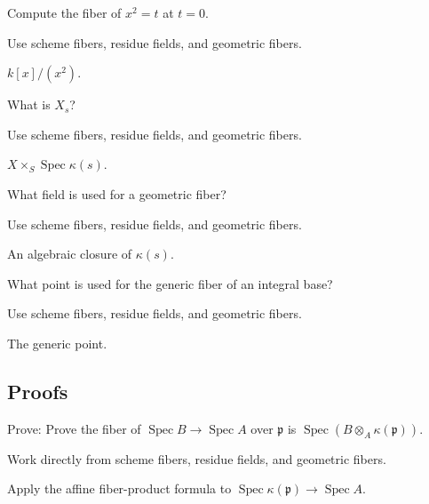\begin{exercise}\label{exr:vi25-expand-02}
Compute the fiber of $x^2=t$ at $t=0$.
\end{exercise}
\begin{hint}
Use scheme fibers, residue fields, and geometric fibers.
\end{hint}
\begin{solution}
$k[x]/(x^2)$.
\end{solution}

\begin{exercise}\label{exr:vi25-expand-03}
What is $X_s$?
\end{exercise}
\begin{hint}
Use scheme fibers, residue fields, and geometric fibers.
\end{hint}
\begin{solution}
$X\times_S\operatorname{Spec}\kappa(s)$.
\end{solution}

\begin{exercise}\label{exr:vi25-expand-04}
What field is used for a geometric fiber?
\end{exercise}
\begin{hint}
Use scheme fibers, residue fields, and geometric fibers.
\end{hint}
\begin{solution}
An algebraic closure of $\kappa(s)$.
\end{solution}

\begin{exercise}\label{exr:vi25-expand-05}
What point is used for the generic fiber of an integral base?
\end{exercise}
\begin{hint}
Use scheme fibers, residue fields, and geometric fibers.
\end{hint}
\begin{solution}
The generic point.
\end{solution}

\subsection*{Proofs}

\begin{exercise}\label{exr:vi25-expand-06}
Prove: Prove the fiber of $\operatorname{Spec}B\to\operatorname{Spec}A$ over $\mathfrak p$ is $\operatorname{Spec}(B\otimes_A\kappa(\mathfrak p))$.
\end{exercise}
\begin{hint}
Work directly from scheme fibers, residue fields, and geometric fibers.
\end{hint}
\begin{solution}
Apply the affine fiber-product formula to $\operatorname{Spec}\kappa(\mathfrak p)\to\operatorname{Spec}A$.
\end{solution}

